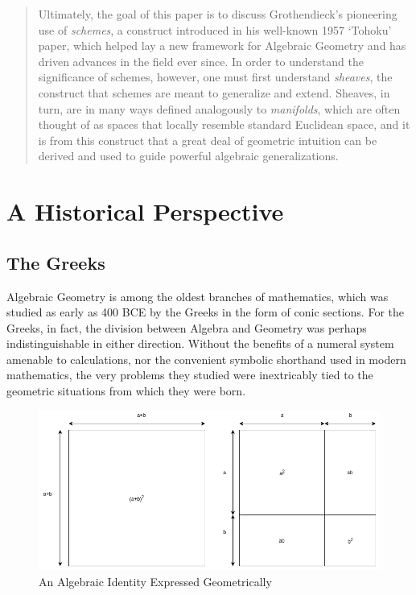 \documentclass{article}
\theoremstyle{definition}
\begin{document}
\begin{abstract}
Ultimately, the goal of this paper is to discuss
Grothendieck's pioneering use of \emph{schemes}, a construct introduced
in his well-known 1957 `Tohoku' paper, which helped lay a new framework
for Algebraic Geometry and has driven advances in the field ever since. In
order to understand the significance of schemes, however, one must first
understand \emph{sheaves}, the construct that schemes are meant to
generalize and extend. Sheaves, in turn, are in many ways defined
analogously to \emph{manifolds}, which are often thought of as spaces
that locally resemble standard Euclidean space, and it is from this
construct that a great deal of geometric intuition can be derived and
used to guide powerful algebraic generalizations.
\end{abstract}

\newpage

\section{A Historical Perspective}\label{header-n30}

\subsection{The Greeks}\label{header-n31}

Algebraic Geometry is among the oldest branches of mathematics, which was
studied as early as 400 BCE by the Greeks in the form of conic sections.
For the Greeks, in fact, the division between Algebra and Geometry was
perhaps indistinguishable in either direction. Without the benefits of a
numeral system amenable to calculations, nor the convenient symbolic
shorthand used in modern mathematics, the very problems they studied
were inextricably tied to the geometric situations from which they were
born.

\begin{figure}[H]
\centering
\includegraphics[width=\linewidth]{identity.png}
\caption{An Algebraic Identity Expressed Geometrically}
\label{fig:my_label}
\end{figure}
\end{document}
